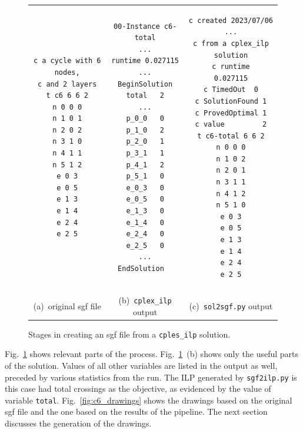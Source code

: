 \begin{figure}
  \centering

\begin{tabular}{ccc}
  \begin{minipage}{0.35\textwidth}
    \small
  \begin{verbatim}
c a cycle with 6 nodes,
c and 2 layers
t c6 6 6 2
n 0 0 0
n 1 0 1
n 2 0 2
n 3 1 0
n 4 1 1
n 5 1 2
e 0 3
e 0 5
e 1 3
e 1 4
e 2 4
e 2 5
\end{verbatim}
  \end{minipage}
&
  \begin{minipage}{0.25\textwidth}
    \small
  \begin{verbatim}
00-Instance	c6-total
...
runtime 0.027115
...
BeginSolution
total	2
...
p_0_0	0
p_1_0	2
p_2_0	1
p_3_1	1
p_4_1	2
p_5_1	0
e_0_3	0
e_0_5	0
e_1_3	0
e_1_4	0
e_2_4	0
e_2_5	0
...
EndSolution  
\end{verbatim}
\end{minipage}
   &
  \begin{minipage}{0.4\textwidth}
    \small
    \begin{verbatim}
c created 2023/07/06 ...
c from a cplex_ilp solution
c runtime      	0.027115
c TimedOut	0
c SolutionFound	1
c ProvedOptimal	1
c value      	2
t c6-total 6 6 2
n 0 0 0
n 1 0 2
n 2 0 1
n 3 1 1
n 4 1 2
n 5 1 0
e 0 3
e 0 5
e 1 3
e 1 4
e 2 4
e 2 5
\end{verbatim}
\end{minipage}
  \\ \\
  (a)~original sgf file
  &
  (b)~\texttt{cplex\_ilp} output
  &
  (c)~\texttt{sol2sgf.py} output
\end{tabular}

    \caption{Stages in creating an sgf file from a \texttt{cples\_ilp} solution.}
    \label{fig:sol2sgf}
\end{figure}

Fig.~\ref{fig:sol2sgf} shows relevant parts of the process. Fig.~\ref{fig:sol2sgf}~(b) shows only the useful parts of the solution. Values of all other variables are listed in the output as well, preceded by various statistics from the run. The ILP generated by \texttt{sgf2ilp.py} is this case had total crossings as the objective, as evidenced by the value of variable \texttt{total}. Fig.~\ref{fig:c6_drawings} shows the drawings based on the original sgf file and the one based on the results of the pipeline. The next section discusses the generation of the drawings.

